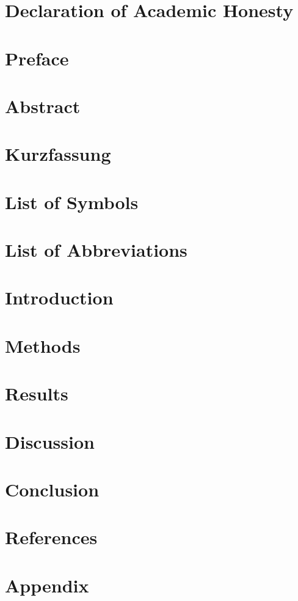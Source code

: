 \documentclass[12pt]{report}
\begin{document}


\chapter*{Declaration of Academic Honesty}

\chapter*{Preface}


\tableofcontents
\chapter*{Abstract}

\chapter*{Kurzfassung}

\listoffigures
{}
\chapter*{List of Symbols}

\listoftables
{}
\chapter*{List of Abbreviations}


\chapter{Introduction}

\chapter{Methods}

\chapter{Results}

\chapter{Discussion}

\chapter{Conclusion}


\chapter*{References}


\appendix
\chapter{Appendix}

\end{document}
